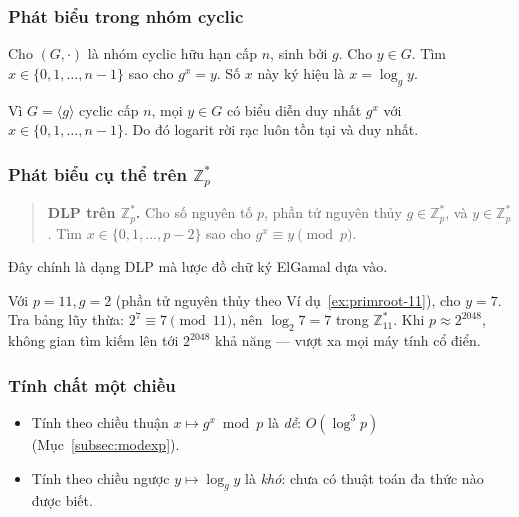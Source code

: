 \documentclass[../DoAn.tex]{subfiles}
\begin{document}
\subsubsection{Phát biểu trong nhóm cyclic}

\begin{definition}
\label{def:dlp}
Cho $(G, \cdot)$ là nhóm cyclic hữu hạn cấp $n$, sinh bởi $g$. Cho $y \in G$. Tìm $x \in \{0, 1, \ldots, n-1\}$ sao cho $g^x = y$. Số $x$ này ký hiệu là $x = \log_g y$.
\end{definition}

\begin{proposition}
Vì $G = \langle g \rangle$ cyclic cấp $n$, mọi $y \in G$ có biểu diễn duy nhất $g^x$ với $x \in \{0, 1, \ldots, n-1\}$. Do đó logarit rời rạc luôn tồn tại và duy nhất.
\end{proposition}

\subsubsection{Phát biểu cụ thể trên \texorpdfstring{$\mathbb{Z}_p^*$}{Zp*}}

\begin{quote}
\textbf{DLP trên $\mathbb{Z}_p^*$.} Cho số nguyên tố $p$, phần tử nguyên thủy $g \in \mathbb{Z}_p^*$, và $y \in \mathbb{Z}_p^*$. Tìm $x \in \{0, 1, \ldots, p-2\}$ sao cho $g^x \equiv y \pmod{p}$.
\end{quote}

Đây chính là dạng DLP mà lược đồ chữ ký ElGamal dựa vào.

\begin{example}
Với $p = 11, g = 2$ (phần tử nguyên thủy theo Ví dụ~\ref{ex:primroot-11}), cho $y = 7$. Tra bảng lũy thừa: $2^7 \equiv 7 \pmod{11}$, nên $\log_2 7 = 7$ trong $\mathbb{Z}_{11}^*$. Khi $p \approx 2^{2048}$, không gian tìm kiếm lên tới $2^{2048}$ khả năng --- vượt xa mọi máy tính cổ điển.
\end{example}

\subsubsection{Tính chất một chiều}

\begin{itemize}[leftmargin=*]
	\item Tính theo chiều thuận $x \mapsto g^x \bmod p$ là \emph{dễ}: $O(\log^3 p)$ (Mục~\ref{subsec:modexp}).
	\item Tính theo chiều ngược $y \mapsto \log_g y$ là \emph{khó}: chưa có thuật toán đa thức nào được biết.
\end{itemize}
\end{document}

